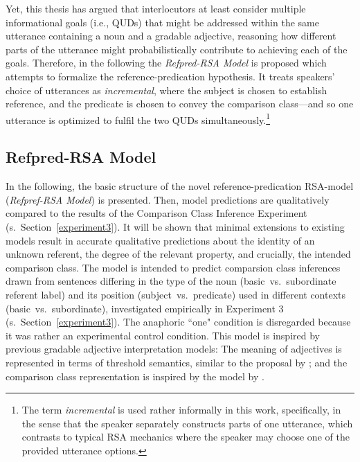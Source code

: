 Yet, this thesis has argued that interlocutors at least consider multiple informational goals (i.e., QUDs) that might be addressed within the same utterance containing a noun and a gradable adjective, reasoning how different parts of the utterance might probabilistically contribute to achieving each of the goals. Therefore, in the following the \emph{Refpred-RSA Model} is proposed which attempts to formalize the reference-predication hypothesis. It treats speakers' choice of utterances as \emph{incremental}, where the subject is chosen to establish reference, and the predicate is chosen to convey the comparison class---and so one utterance is optimized to fulfil the two QUDs simultaneously.\footnote{The term \emph{incremental} is used rather informally in this work, specifically, in the sense that the speaker separately constructs parts of one utterance, which contrasts to typical RSA mechanics where the speaker may choose one of the provided utterance options.} 

\subsection{Refpred-RSA Model}
\label{refpred-rsa}
In the following, the basic structure of the novel reference-predication RSA-model (\emph{Refpref-RSA Model}) is presented. %
Then, model predictions are qualitatively compared to the results of the Comparison Class Inference Experiment (s.~Section~\ref{experiment3}). It will be shown that minimal extensions to existing models result in accurate qualitative predictions about the identity of an unknown referent, the degree of the relevant property, and crucially, the intended comparison class. 
The model is intended to predict comparsion class inferences drawn from sentences differing in the type of the noun (basic~vs.~subordinate referent label) and its position (subject~vs.~predicate) used in different contexts (basic~vs.~subordinate), investigated empirically in Experiment 3 (s.~Section~\ref{experiment3}). The anaphoric ``one" condition is disregarded because it was rather an experimental control condition. This model is inspired by previous gradable adjective interpretation models: The meaning of adjectives is represented in terms of threshold semantics, similar to the proposal by \textcite{lassiter2013context}; and the comparison class representation is inspired by the model by \textcite{tessler2017warm}.

